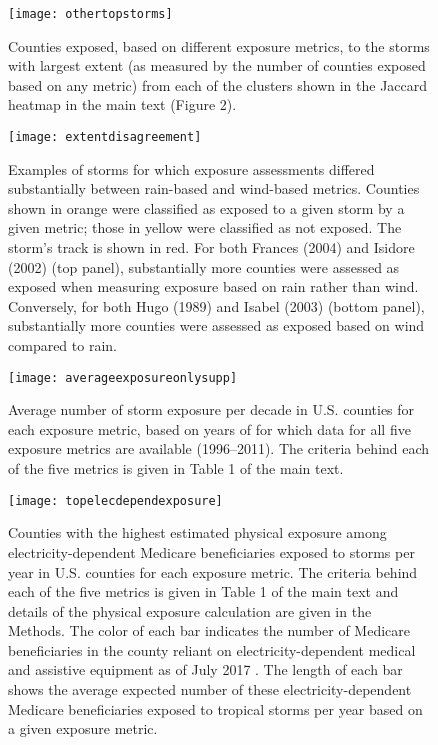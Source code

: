 \documentclass[11pt, titlepage]{article}
\begin{document}
\clearpage

\begin{figure}[tbhp!]
\centering
\texttt{[image: othertopstorms]}
\caption{Counties exposed, based on different exposure metrics, to the storms with largest extent (as measured by the number of counties exposed based on any metric) from each of the clusters shown in the Jaccard heatmap in the main text (Figure 2).}
\label{fig:othertopstorms}
\end{figure}

\clearpage

\begin{figure}[tbhp!]
\centering
\texttt{[image: extentdisagreement]}
\caption{Examples of storms for which exposure assessments differed substantially between rain-based and wind-based metrics. Counties shown in orange were classified as exposed to a given storm by a given metric; those in yellow were classified as not exposed. The storm's track is shown in red. For both Frances (2004) and Isidore (2002) (top panel), substantially more counties were assessed as exposed when measuring exposure based on rain rather than wind. Conversely, for both Hugo (1989) and Isabel (2003) (bottom panel), substantially more counties were assessed as exposed based on wind compared to rain.}
\label{fig:extentdisagreement}
\end{figure}

\clearpage

\begin{figure}[tbhp!]
\centering
\texttt{[image: averageexposureonlysupp]}
\caption{Average number of storm exposure per decade in U.S. counties for each exposure metric, based on years of for which data for all five exposure metrics are available (1996--2011). The criteria behind each of the five metrics is given in Table 1 of the main text.}
\label{fig:averageexposuresupp}
\end{figure}

\clearpage

\begin{figure*}%
\centering
\texttt{[image: topelecdependexposure]}
\caption{Counties with the highest estimated physical exposure among electricity-dependent Medicare beneficiaries exposed to storms per year in U.S. counties for each exposure metric. The criteria behind each of the five metrics is given in Table 1 of the main text and details of the physical exposure calculation are given in the Methods. The color of each bar indicates the number of Medicare beneficiaries in the county reliant on electricity-dependent medical and assistive equipment as of July 2017 \citep{empower}. The length of each bar shows the average expected number of these electricity-dependent Medicare beneficiaries exposed to tropical storms per year based on a given exposure metric.}
\label{fig:topelecdependexposure}
\end{figure*}
\end{document}
